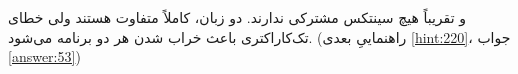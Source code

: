 \section{}
\paragraph{}\label{hint:158}
 و  تقریباً هیچ سینتکس مشترکی ندارند. دو زبان، کاملاً متفاوت هستند ولی خطای تک‌کاراکتری باعث خراب شدن هر دو برنامه می‌شود. (راهنماییِ بعدی \ref{hint:220}، جواب \ref{answer:53})